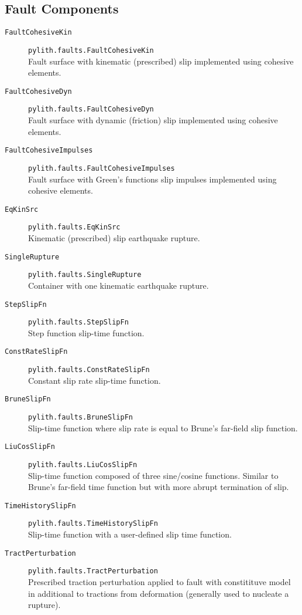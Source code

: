 \subsection{Fault Components}
\begin{description}
\item [{\texttt{FaultCohesiveKin}}] \texttt{pylith.faults.FaultCohesiveKin}\\
Fault surface with kinematic (prescribed) slip implemented using cohesive
elements.
\item [{\texttt{FaultCohesiveDyn}}] \texttt{pylith.faults.FaultCohesiveDyn}\\
Fault surface with dynamic (friction) slip implemented using cohesive
elements.
\item [{\texttt{FaultCohesiveImpulses}}] \texttt{pylith.faults.FaultCohesiveImpulses}\\
Fault surface with Green's functions slip impulses implemented using
cohesive elements.
\item [{\texttt{EqKinSrc}}] \texttt{pylith.faults.EqKinSrc}\\
Kinematic (prescribed) slip earthquake rupture.
\item [{\texttt{SingleRupture}}] \texttt{pylith.faults.SingleRupture}\\
Container with one kinematic earthquake rupture.
\item [{\texttt{StepSlipFn}}] \texttt{pylith.faults.StepSlipFn}\\
Step function slip-time function.
\item [{\texttt{ConstRateSlipFn}}] \texttt{pylith.faults.ConstRateSlipFn}\\
Constant slip rate slip-time function.
\item [{\texttt{BruneSlipFn}}] \texttt{pylith.faults.BruneSlipFn}\\
Slip-time function where slip rate is equal to Brune's far-field slip
function.
\item [{\texttt{LiuCosSlipFn}}] \texttt{pylith.faults.LiuCosSlipFn}\\
Slip-time function composed of three sine/cosine functions. Similar
to Brune's far-field time function but with more abrupt termination
of slip.
\item [{\texttt{TimeHistorySlipFn}}] \texttt{pylith.faults.TimeHistorySlipFn}\\
Slip-time function with a user-defined slip time function.
\item [{\texttt{TractPerturbation}}] \texttt{pylith.faults.TractPerturbation}\\
Prescribed traction perturbation applied to fault with constitituve
model in additional to tractions from deformation (generally used
to nucleate a rupture).
\end{description}

